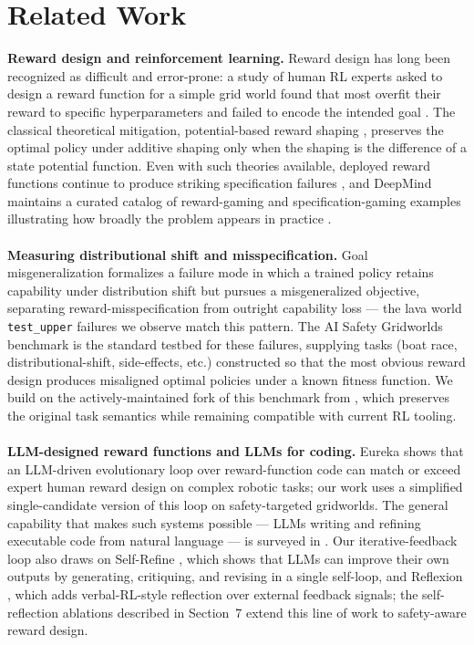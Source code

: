 \documentclass[11pt]{article}
\begin{document}
\section{Related Work}
\textbf{Reward design and reinforcement learning.} Reward design has long been recognized as difficult and error-prone: a study of human RL experts asked to design a reward function for a simple grid world found that most overfit their reward to specific hyperparameters and failed to encode the intended goal \cite{Boothperilsreward}. The classical theoretical mitigation, potential-based reward shaping \cite{ng1999policy}, preserves the optimal policy under additive shaping only when the shaping is the difference of a state potential function. Even with such theories available, deployed reward functions continue to produce striking specification failures \cite{clark2016faultyrewardfunctions}, and DeepMind maintains a curated catalog of reward-gaming and specification-gaming examples illustrating how broadly the problem appears in practice \cite{krakovna2020specificationgaming}.
\\\\
\textbf{Measuring distributional shift and misspecification.} Goal misgeneralization \cite{shah2022goalmisgeneralizationcorrectspecifications} formalizes a failure mode in which a trained policy retains capability under distribution shift but pursues a misgeneralized objective, separating reward-misspecification from outright capability loss --- the lava world \texttt{test\_upper} failures we observe match this pattern. The AI Safety Gridworlds benchmark \cite{leike2017aisafetygridworlds} is the standard testbed for these failures, supplying tasks (boat race, distributional-shift, side-effects, etc.) constructed so that the most obvious reward design produces misaligned optimal policies under a known fitness function. We build on the actively-maintained fork of this benchmark from \cite{pihlakas2024aisafetygridworlds}, which preserves the original task semantics while remaining compatible with current RL tooling.
\\\\
\textbf{LLM-designed reward functions and LLMs for coding.} Eureka \cite{ma2024eurekahumanlevelrewarddesign} shows that an LLM-driven evolutionary loop over reward-function code can match or exceed expert human reward design on complex robotic tasks; our work uses a simplified single-candidate version of this loop on safety-targeted gridworlds. The general capability that makes such systems possible --- LLMs writing and refining executable code from natural language --- is surveyed in \cite{Jiang_2026}. Our iterative-feedback loop also draws on Self-Refine \cite{madaan2023selfrefine}, which shows that LLMs can improve their own outputs by generating, critiquing, and revising in a single self-loop, and Reflexion \cite{shinn2023reflexion}, which adds verbal-RL-style reflection over external feedback signals; the self-reflection ablations described in Section~7 extend this line of work to safety-aware reward design.
\end{document}

